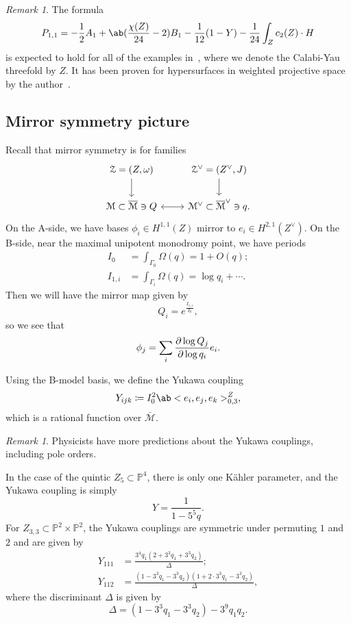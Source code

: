 \documentclass[10pt,oldfontcommands,oneside]{memoir}
\theoremstyle{definition}
\theoremstyle{remark}
\newtheorem{rmk}[thm]{Remark}
\theoremstyle{plain}
\theoremstyle{definition}
\theoremstyle{remark}
\renewcommand{\P}{\mathbb{P}}
\newcommand{\M}{\mathcal{M}}
\newcommand{\Mbar}{\overline{\mathcal{M}}}
\newcommand{\mc}[1]{\mathcal{#1}}
\newcommand{\1}{\mathbf{1}}
\newcommand{\2}{\mathbf{2}}
\newcommand{\3}{\mathbf{3}}
\begin{document}
\begin{rmk}
    The formula
    \[ P_{1,1} = -\frac{1}{2} A_1 + \ab(\frac{\chi(Z)}{24} -2) B_1 - \frac{1}{12}(1-Y) - \frac{1}{24} \int_Z c_2(Z) \cdot H \]
    is expected to hold for all of the examples in~, where we denote the Calabi-Yau threefold by $Z$. It has been proven for hypersurfaces in weighted projective space by the author~\cite{polynomiality}.
\end{rmk}


\subsection{Mirror symmetry picture}%
\label{sub:Mirror symmetry picture}

Recall that mirror symmetry is for families
\begin{equation*}
\begin{tikzcd}
    \mc{Z} = (Z,\omega) \ar{d} & \mc{Z}^{\vee} = (Z^{\vee}, J) \ar{d} \\
    \mc{M} \subset \Mbar \ni Q \ar[leftrightarrow]{r} & \M^{\vee} \subset \Mbar^{\vee} \ni q.
\end{tikzcd}
\end{equation*}
On the A-side, we have bases $\phi_i \in H^{1,1}(Z)$ mirror to $e_i \in H^{2,1}(Z^{\vee})$. On the B-side, near the maximal unipotent monodromy point, we have periods
\begin{align*}
    I_0 &= \int_{\Gamma_0} \Omega(q) = 1 + O(q); \\
    I_{1,i} &= \int_{\Gamma_i} \Omega(q) = \log q_i + \cdots.
\end{align*}
Then we will have the mirror map given by
\[ Q_i = e^{\frac{I_{1,i}}{I_0}}, \]
so we see that
\[ \phi_j = \sum_i \pdv{\log Q_j}{\log q_i} e_i. \]

Using the B-model basis, we define the Yukawa coupling
\[ Y_{ijk} \coloneqq I_0^2 \ab<e_i, e_j, e_k>_{0,3}^Z, \]
which is a rational function over $\bar{\M}$.

\begin{rmk}
    Physicists have more predictions about the Yukawa couplings, including pole orders.
\end{rmk}

In the case of the quintic $Z_5 \subset \P^4$, there is only one K\"ahler parameter, and the Yukawa coupling is simply
\[ Y = \frac{1}{1-5^5 q}. \]
For $Z_{3,3} \subset \P^2 \times \P^2$, the Yukawa couplings are symmetric under permuting $1$ and $2$ and are given by
\begin{align*}
    Y_{111} &= \frac{3^4 q_1 (2+3^3 q_1 + 3^3 q_2)}{\Delta}; \\
    Y_{112} &= \frac{(1-3^3 q_1 - 3^3 q_2)(1+2 \cdot 3^3 q_1 - 3^3 q_2)}{\Delta},
\end{align*}
where the discriminant $\Delta$ is given by
\[ \Delta = (1-3^3 q_1 - 3^3 q_2) - 3^9 q_1 q_2. \]
\end{document}
